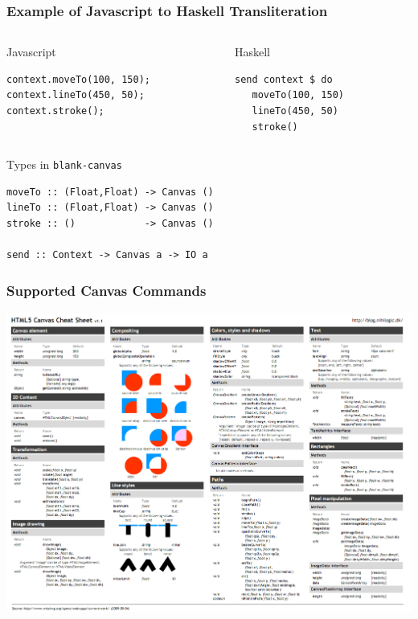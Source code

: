 \documentclass{beamer}
\begin{document}
\begin{frame}[fragile]
\frametitle{Example of Javascript to Haskell Transliteration}

\begin{columns}
\begin{column}{0.50\textwidth}
\begin{codeblock*}[0.85]{Javascript}
\begin{verbatim}
context.moveTo(100, 150);
context.lineTo(450, 50);
context.stroke();
\end{verbatim}
\end{codeblock*}
\end{column}

\pause{}
\begin{column}{0.50\textwidth}
\begin{codeblock*}[0.65]{Haskell}
\begin{verbatim}
send context $ do
   moveTo(100, 150)
   lineTo(450, 50)
   stroke()
\end{verbatim}
\end{codeblock*}
\end{column}

\end{columns}

\frameskip
\frameskip
\frameskip

\pause{}

\centering
\begin{codeblock*}[0.6]{Types in {\tt blank-canvas}}
\begin{verbatim}
moveTo :: (Float,Float) -> Canvas ()
lineTo :: (Float,Float) -> Canvas ()
stroke :: ()            -> Canvas ()

send :: Context -> Canvas a -> IO a
\end{verbatim}
\end{codeblock*}

\end{frame}        
        
\begin{frame}[fragile]
\frametitle{Supported Canvas Commands}

\includegraphics[width=.95\textwidth]{HTML5_Canvas_Cheat_Sheet.png}

\end{frame}
\end{document}
